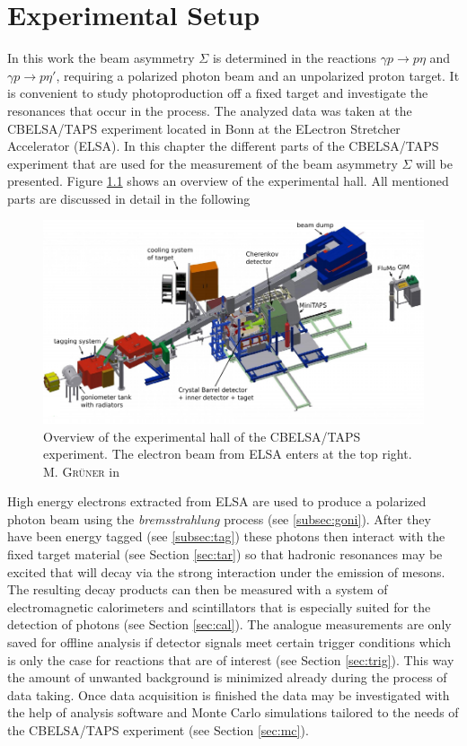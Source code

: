 \chapter{Experimental Setup}
\label{chap:exp}
In this work the beam asymmetry $\Sigma$ is determined in the reactions $\gamma p\to p\eta$ and $\gamma p\to p\eta'$, requiring a polarized photon beam and an unpolarized proton target. It is convenient to study photoproduction off a fixed target and investigate the resonances that occur in the process. The analyzed data was taken at the CBELSA/TAPS experiment located in Bonn  at the ELectron Stretcher Accelerator (ELSA). In this chapter the different parts of the CBELSA/TAPS experiment that are used for the measurement of the beam asymmetry $\Sigma$ will be presented. Figure \ref{fig:cbarea} shows an overview of the experimental hall. All mentioned parts are discussed in detail in the following
\begin{figure}[htbp]
	\centering
	\includegraphics[width=\linewidth]{figs/cbarea.pdf}
	\caption{Overview of the experimental hall of the CBELSA/TAPS experiment. The electron beam from ELSA enters at the top right. \textsc{M. Grüner} in \cite{farahphd}}
	\label{fig:cbarea}
\end{figure}
\noindent High energy electrons extracted from ELSA are used to produce a polarized photon beam using the \emph{bremsstrahlung} process (see \ref{subsec:goni}). After they have been energy tagged (see \ref{subsec:tag}) these photons then interact with the fixed target material (see Section \ref{sec:tar}) so that hadronic resonances may be excited that will decay via the strong interaction under the emission of mesons. The resulting decay products can then be measured with a system of electromagnetic calorimeters and scintillators that is especially suited for the detection of photons (see Section \ref{sec:cal}). The analogue measurements are only saved for offline analysis if detector signals meet certain trigger conditions which is only the case for reactions that are of interest (see Section \ref{sec:trig}). This way the amount of unwanted background is minimized already during the process of data taking. Once data acquisition is finished the data may be investigated with the help of analysis software and Monte Carlo simulations tailored to the needs of the CBELSA/TAPS experiment (see Section \ref{sec:mc}).
